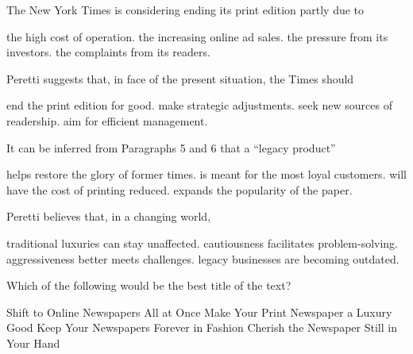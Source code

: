 \item The New York Times is considering ending its print edition partly due to
\begin{tasks}
	\task the high cost of operation.
	\task the increasing online ad sales.
	\task the pressure from its investors.
	\task the complaints from its readers.
\end{tasks}
\item Peretti suggests that, in face of the present situation, the Times should
\begin{tasks}
	\task end the print edition for good.
	\task make strategic adjustments.
	\task seek new sources of readership.
	\task aim for efficient management.
\end{tasks}
\item It can be inferred from Paragraphs 5 and 6 that a ``legacy product''
\begin{tasks}
	\task helps restore the glory of former times.
	\task is meant for the most loyal customers.
	\task will have the cost of printing reduced.
	\task expands the popularity of the paper.
\end{tasks}
\item Peretti believes that, in a changing world,
\begin{tasks}
	\task traditional luxuries can stay unaffected.
	\task cautiousness facilitates problem-solving.
	\task aggressiveness better meets challenges.
	\task legacy businesses are becoming outdated.
\end{tasks}
\item Which of the following would be the best title of the text?
\begin{tasks}
	\task Shift to Online Newspapers All at Once
	\task Make Your Print Newspaper a Luxury Good
	\task Keep Your Newspapers Forever in Fashion
	\task Cherish the Newspaper Still in Your Hand
\end{tasks}
